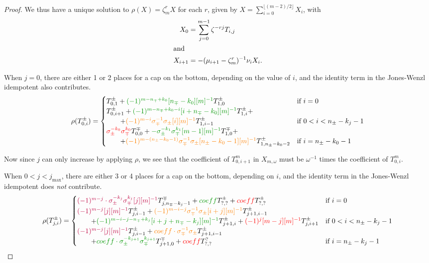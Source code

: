 \documentclass[12pt]{article}
\begin{document}
\begin{proof}
We thus have a unique solution to $\rho(X) = \zeta_m^r X$ for each $r$, given by $X = \sum_{i=0}^{\lfloor(m-2)/2\rfloor} X_i$, with
\begin{align*}
X_0 & = \sum_{j=0}^{m-1} \zeta^{-rj} T_{i,j} \\
\intertext{and}
X_{i+1} & = - (\mu_{i+1} - \zeta_m^r)^{-1} \nu_i X_i.
\end{align*}



When $j=0$, there are either 1 or 2 places for a cap on the bottom, depending on the value of $i$, and the identity term in the Jones-Wenzl idempotent also contributes.
$$
\rho(T^\pm_{0,i}) = 
\begin{cases}
T^\pm_{0,1}
+\textcolor{DarkGreen}{(-1)^{m-n_\mp+k_0}[n_\mp-k_0][m]^{-1}} T^\pm_{1,0}&\text{if $i=0$}
\\
T^\pm_{0,i+1}
+\textcolor{DarkGreen}{(-1)^{m-n_\mp+k_0-i}[i+n_\mp-k_0][m]^{-1}} T^\pm_{1,i} +
\\ \qquad + \textcolor{orange}{(-1)^{m-i} \sigma^{-1}_\mp\sigma_\pm [i][m]^{-1}} T^\pm_{1,i-1}
&\text{if }0 < i <n_\pm-k_j-1
\\
\textcolor{red}{\sigma_\pm^{-k_0} \sigma_\mp^{k_0}} T^\mp_{0,0}
+\textcolor{DarkGreen}{-\sigma_\pm^{-k_1} \sigma_\mp^{k_1} [m-1][m]^{-1} } T^\mp_{1,0} +
\\ \qquad +\textcolor{orange}{(-1)^{m-(n_\pm-k_0-1)} \sigma^{-1}_\mp\sigma_\pm [n_\pm-k_0-1][m]^{-1} } T^\pm_{1,n_\pm-k_0-2}
&\text{if } i = n_\pm-k_0-1
\end{cases}
$$

Now since $j$ can only increase by applying $\rho$, we see that the coefficient of $T^m_{0,i+1}$ in $X_{m,\omega}$ must be $\omega^{-1}$ times the coefficient of $T^m_{0,i}$.

When $0<j<j_{\text{max}}$, there are 
either 3 or 4 places for a cap on the bottom, depending on $i$, and the identity term in the Jones-Wenzl idempotent does \emph{not} contribute.
$$
\rho(T^\pm_{j,i}) = 
\begin{cases}
\textcolor{purple}{(-1)^{m-j}\cdot \sigma_\pm^{-k_j}\sigma_\mp^{k_j} [j][m]^{-1}} T^\mp_{j,n_\mp-k_j-1}
+\textcolor{DarkGreen}{coeff} T^\pm_{?,?}
+\textcolor{red}{coeff} T^\pm_{?,?}
&\text{if $i=0$}
\\
\textcolor{purple}{(-1)^{m-j}[j][m]^{-1}} T^\pm_{j,i-1}
+\textcolor{orange}{(-1)^{m-i-j} \sigma^{-1}_\mp\sigma_\pm [i+j][m]^{-1} } T^\pm_{j+1,i-1}
\\ \qquad
+\textcolor{DarkGreen}{(-1)^{m-i-j-n_{\mp}+k_j}[i+j+n_{\mp}-k_j][m]^{-1}} T^\pm_{j+1,i}
+\textcolor{red}{(-1)^j [m-j][m]^{-1}} T^\pm_{j,i+1}
&\text{if $0 < i <n_\pm-k_j-1$}
\\
\textcolor{purple}{(-1)^{m-j}[j][m]^{-1}} T^\pm_{j,i-1}
+\textcolor{orange}{coeff \cdot \sigma^{-1}_\mp\sigma_\pm} T^\pm_{j+1,i-1}
\\ \qquad
+\textcolor{DarkGreen}{coeff \cdot\sigma_\pm^{-k_{j+1}}\sigma_\mp^{k_{j+1}} } T^{\mp}_{j+1,0}
+\textcolor{red}{coeff} T^{?}_{?,?}
&\text{if  $i =n_\pm-k_j-1$}
\end{cases}
$$


\end{proof}
\end{document}
